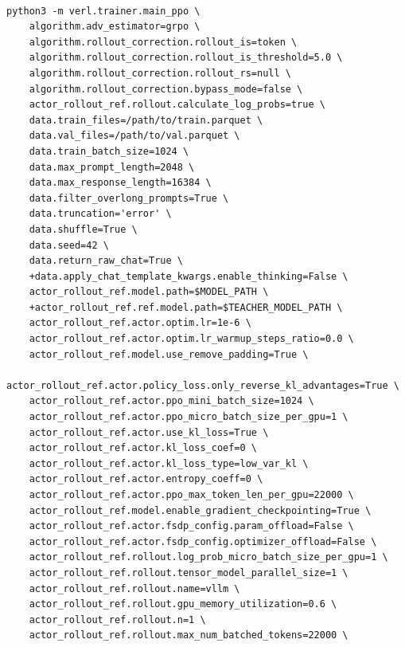 \documentclass{llmxive}
\begin{document}
\begin{tcolorbox}[
    colback=gray!5,          %
    colframe=gray!70,        %
    arc=3pt,                 %
    left=2pt,
    right=2pt,
    top=2pt,
    bottom=2pt,
    boxrule=0.5pt,           %
    breakable,               %
    fontupper=\small,
    listing only,            %
    listing options={language=Python}, %
    title=OPD Training Command, %
    title style={color=black},          %
    label=py1                %
]
\begin{verbatim}

python3 -m verl.trainer.main_ppo \
    algorithm.adv_estimator=grpo \
    algorithm.rollout_correction.rollout_is=token \
    algorithm.rollout_correction.rollout_is_threshold=5.0 \
    algorithm.rollout_correction.rollout_rs=null \
    algorithm.rollout_correction.bypass_mode=false \
    actor_rollout_ref.rollout.calculate_log_probs=true \
    data.train_files=/path/to/train.parquet \
    data.val_files=/path/to/val.parquet \
    data.train_batch_size=1024 \
    data.max_prompt_length=2048 \
    data.max_response_length=16384 \
    data.filter_overlong_prompts=True \
    data.truncation='error' \
    data.shuffle=True \
    data.seed=42 \
    data.return_raw_chat=True \
    +data.apply_chat_template_kwargs.enable_thinking=False \
    actor_rollout_ref.model.path=$MODEL_PATH \
    +actor_rollout_ref.ref.model.path=$TEACHER_MODEL_PATH \
    actor_rollout_ref.actor.optim.lr=1e-6 \
    actor_rollout_ref.actor.optim.lr_warmup_steps_ratio=0.0 \
    actor_rollout_ref.model.use_remove_padding=True \
    actor_rollout_ref.actor.policy_loss.only_reverse_kl_advantages=True \
    actor_rollout_ref.actor.ppo_mini_batch_size=1024 \
    actor_rollout_ref.actor.ppo_micro_batch_size_per_gpu=1 \
    actor_rollout_ref.actor.use_kl_loss=True \
    actor_rollout_ref.actor.kl_loss_coef=0 \
    actor_rollout_ref.actor.kl_loss_type=low_var_kl \
    actor_rollout_ref.actor.entropy_coeff=0 \
    actor_rollout_ref.actor.ppo_max_token_len_per_gpu=22000 \
    actor_rollout_ref.model.enable_gradient_checkpointing=True \
    actor_rollout_ref.actor.fsdp_config.param_offload=False \
    actor_rollout_ref.actor.fsdp_config.optimizer_offload=False \
    actor_rollout_ref.rollout.log_prob_micro_batch_size_per_gpu=1 \
    actor_rollout_ref.rollout.tensor_model_parallel_size=1 \
    actor_rollout_ref.rollout.name=vllm \
    actor_rollout_ref.rollout.gpu_memory_utilization=0.6 \
    actor_rollout_ref.rollout.n=1 \
    actor_rollout_ref.rollout.max_num_batched_tokens=22000 \

\end{verbatim}
\end{tcolorbox}
\end{document}
